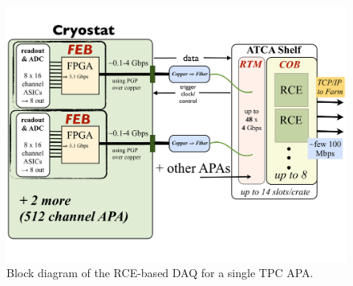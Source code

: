 


\begin{figure}[p]
\includegraphics[scale=0.6,angle=90]{LBNE-DAQ-BlockDiagram.pdf}
\caption{Block diagram of the RCE-based DAQ for a single TPC APA.}
\label{fig:blockDiag}
\end{figure} 


